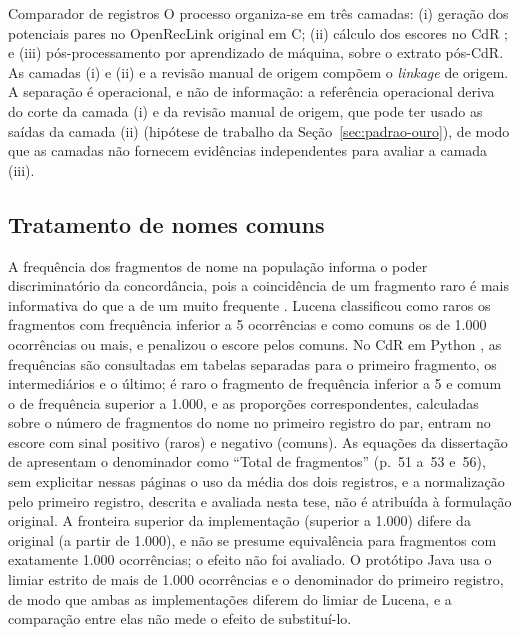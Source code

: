 \begin{chapter}{Comparador de registros}
O processo organiza-se em três camadas: (i) geração dos potenciais pares no OpenRecLink original em C; (ii) cálculo dos escores no CdR \cite{Jardim2025comparador, Lucena2013algoritmos}; e (iii) pós-processamento por aprendizado de máquina, sobre o extrato pós-CdR. As camadas (i) e (ii) e a revisão manual de origem compõem o \textit{linkage} de origem. A separação é operacional, e não de informação: a referência operacional deriva do corte da camada (i) e da revisão manual de origem, que pode ter usado as saídas da camada (ii) (hipótese de trabalho da Seção~\ref{sec:padrao-ouro}), de modo que as camadas não fornecem evidências independentes para avaliar a camada (iii).

\subsection{Tratamento de nomes comuns}\label{sub:nomes-comuns}

A frequência dos fragmentos de nome na população informa o poder discriminatório da concordância, pois a coincidência de um fragmento raro é mais informativa do que a de um muito frequente \cite{Lucena2013algoritmos}. Lucena \citeyearpar{Lucena2013algoritmos} classificou como raros os fragmentos com frequência inferior a 5 ocorrências e como comuns os de 1.000 ocorrências ou mais, e penalizou o escore pelos comuns. No CdR em Python \cite{Jardim2025comparador}, as frequências são consultadas em tabelas separadas para o primeiro fragmento, os intermediários e o último; é raro o fragmento de frequência inferior a 5 e comum o de frequência superior a 1.000, e as proporções correspondentes, calculadas sobre o número de fragmentos do nome no primeiro registro do par, entram no escore com sinal positivo (raros) e negativo (comuns). As equações da dissertação de  apresentam o denominador como ``Total de fragmentos'' (p.~51 a~53 e~56), sem explicitar nessas páginas o uso da média dos dois registros, e a normalização pelo primeiro registro, descrita e avaliada nesta tese, não é atribuída à formulação original. A fronteira superior da implementação (superior a 1.000) difere da original (a partir de 1.000), e não se presume equivalência para fragmentos com exatamente 1.000 ocorrências; o efeito não foi avaliado. O protótipo Java usa o limiar estrito de mais de 1.000 ocorrências e o denominador do primeiro registro, de modo que ambas as implementações diferem do limiar de Lucena, e a comparação entre elas não mede o efeito de substituí-lo.


\end{chapter}
